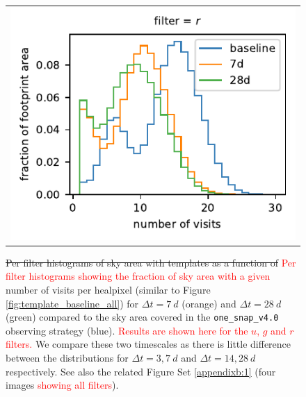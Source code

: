 \documentclass[preprintm,linenumbers]{aastex631}
\newcommand{\baseline}{\texttt{one\_snap\_v4.0}\xspace}
\providecommand{\red}[1]{\textcolor{red}{#1}}
\begin{document}
\begin{figure}
\begin{tabular}{@{}c@{}c@{}}
				\multicolumn{2}{c}{\includegraphics{results/histograms/hist_first_year_one_snap_v4_0_10yrs_db_noDD_noTwi_CountMetric_doAllTemplateMetrics_reduceCount_r_noDD_noTwi.pdf}} \\
			\end{tabular}
			\caption{
				\sout{Per filter histograms of sky area with templates as a function of}       
             \red{Per filter histograms showing the fraction of sky area with a given} number of visits per healpixel (similar to Figure \ref{fig:template_baseline_all}) for $\Delta t = 7\ \si{d}$ (orange) and $\Delta t = 28\ \si{d}$ (green) compared to the sky area covered in the \baseline observing strategy (blue).
                \red{Results are shown here for the $u$, $g$ and $r$ filters.}
    We compare these two timescales as there is little difference between the distributions for $\Delta t = 3, 7\ \si{d}$ and $\Delta t = 14, 28\ \si{d}$ respectively.
   See also the related Figure Set \ref{appendixb:1} (four images \red{showing all filters}).
			}
			\label{fig:template_baseline_histograms7_28d}
		\end{figure}
\end{document}
